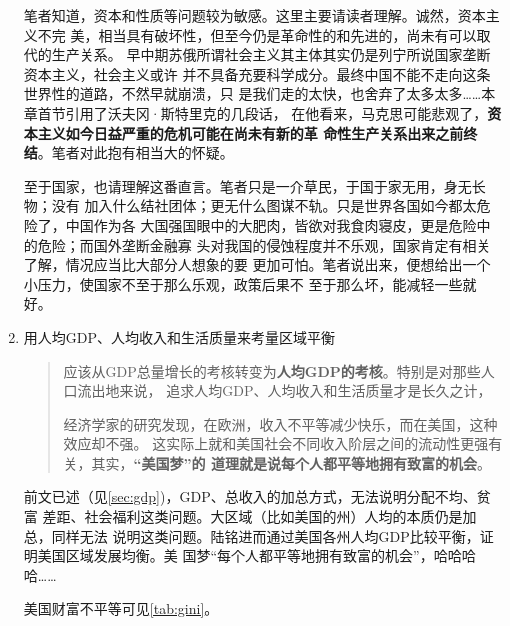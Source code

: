 \begin{enumerate}

  笔者知道，资本和性质等问题较为敏感。这里主要请读者理解。诚然，资本主义不完
  美，相当具有破坏性，但至今仍是革命性的和先进的，尚未有可以取代的生产关系。
  早中期苏俄所谓社会主义其主体其实仍是列宁所说国家垄断资本主义，社会主义或许
  并不具备充要科学成分。最终中国不能不走向这条世界性的道路，不然早就崩溃，只
  是我们走的太快，也舍弃了太多太多……本章首节引用了沃夫冈·斯特里克的几段话，
  在他看来，马克思可能悲观了，\textbf{资本主义如今日益严重的危机可能在尚未有新的革
    命性生产关系出来之前终结}。笔者对此抱有相当大的怀疑。

  至于国家，也请理解这番直言。笔者只是一介草民，于国于家无用，身无长物；没有
  加入什么结社团体；更无什么图谋不轨。只是世界各国如今都太危险了，中国作为各
  大国强国眼中的大肥肉，皆欲对我食肉寝皮，更是危险中的危险；而国外垄断金融寡
  头对我国的侵蚀程度并不乐观，国家肯定有相关了解，情况应当比大部分人想象的要
  更加可怕。笔者说出来，便想给出一个小压力，使国家不至于那么乐观，政策后果不
  至于那么坏，能减轻一些就好。


\item 用人均GDP、人均收入和生活质量来考量区域平衡

  \begin{quotation}
    应该从GDP总量增长的考核转变为\textbf{人均GDP的考核}。特别是对那些人口流出地来说，
    追求人均GDP、人均收入和生活质量才是长久之计，

    经济学家的研究发现，在欧洲，收入不平等减少快乐，而在美国，这种效应却不强。
    这实际上就和美国社会不同收入阶层之间的流动性更强有关，其实，\textbf{“美国梦”的
      道理就是说每个人都平等地拥有致富的机会}。
  \end{quotation}

  前文已述（见\cref{sec:gdp})，GDP、总收入的加总方式，无法说明分配不均、贫富
  差距、社会福利这类问题。大区域（比如美国的州）人均的本质仍是加总，同样无法
  说明这类问题。陆铭进而通过美国各州人均GDP比较平衡，证明美国区域发展均衡。美
  国梦“每个人都平等地拥有致富的机会”，哈哈哈哈……

  美国财富不平等可见\cref{tab:gini}。


\end{enumerate}
